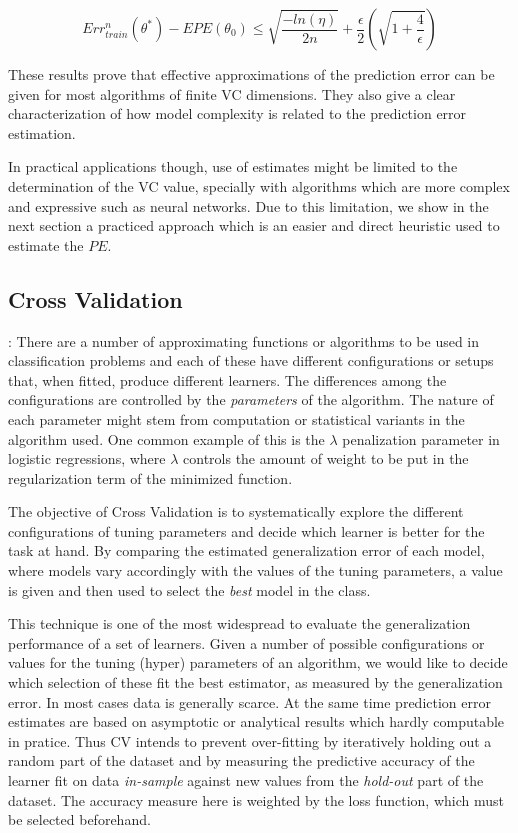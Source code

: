 \begin{equation}\label{vapnik-classificationBoundPrecise}
Err^n_{train}(\theta^*) - EPE(\theta_0) \leq  \sqrt{\frac{-ln(\eta)}{2n} } + \frac{\epsilon}{2}\left( \sqrt{1 + \frac{4}{\epsilon} } \right)
\end{equation}

These results prove that effective approximations of the prediction error can be given for most algorithms of finite VC dimensions. They also give a clear characterization of how model complexity is related to the prediction error estimation.

In practical applications though, use of estimates might be limited to the determination of the VC value, specially with algorithms which are more complex and expressive such as neural networks. Due to this limitation, we show in the next section a practiced approach which is an easier and direct heuristic used to estimate the $PE$.


\subsection{Cross Validation}:
 There are a number of approximating functions or algorithms to be used in classification problems and each of these have different configurations or setups that, when fitted, produce different learners. The differences among the configurations are controlled by the \textit{parameters} of the algorithm. The nature of each parameter might stem from computation or statistical variants in the algorithm used. One common example of this is the $\lambda$ penalization parameter in logistic regressions, where $\lambda$ controls the amount of weight to be put in the regularization term of the minimized function.

The objective of Cross Validation is to systematically explore the different configurations of tuning parameters and decide which learner is better for the task at hand. By comparing the estimated generalization error of each model, where models vary accordingly with the values of the tuning parameters, a value is given and then used to select the \textit{best} model in the class.

This technique is one of the most widespread to evaluate the generalization performance of a set of learners. Given a number of possible configurations or values for the tuning (hyper) parameters of an algorithm, we would like to decide which selection of these fit the best estimator, as measured by the generalization error. In most cases data is generally scarce. At the same time prediction error estimates are based on asymptotic or analytical results which hardly computable in pratice. Thus CV intends to prevent over-fitting by iteratively holding out a random part of the dataset and by measuring the predictive accuracy of the learner fit on data \textit{in-sample} against new values from the \textit{hold-out} part of the dataset. The accuracy measure here is weighted by the loss function, which must be selected beforehand.

